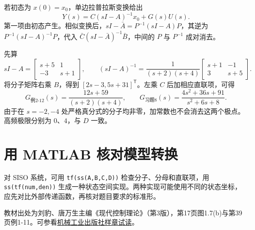 若初态为 $x(0)=x_0$，单边拉普拉斯变换给出
\[
Y(s)=C(sI-A)^{-1}x_0+G(s)U(s).
\]
第一项由初态产生。相似变换后，$sI-\bar A=P^{-1}(sI-A)P$，其逆为 $P^{-1}(sI-A)^{-1}P$，代入 $\bar C(sI-\bar A)^{-1}\bar B$，中间的 $P$ 与 $P^{-1}$ 成对消去。



\sol 先算
\[
sI-A=\begin{bmatrix}s+5&1\\-3&s+1\end{bmatrix},\qquad
(sI-A)^{-1}=\frac{1}{(s+2)(s+4)}
\begin{bmatrix}s+1&-1\\3&s+5\end{bmatrix}.
\]
将分子矩阵右乘 $B$，得到 $[2s-3,5s+31]^{\mathsf T}$。左乘 $C$ 后加相应直联项，可得
\[
G_{\text{例2-12}}(s)=\frac{12s+59}{(s+2)(s+4)},\qquad
G_{\text{习题8}}(s)=\frac{4s^2+36s+91}{s^2+6s+8}.
\]
由于在 $s=-2,-4$ 处严格真分式的分子均非零，加常数也不会消去这两个极点。高频极限分别为 $0$、$4$，与 $D$ 一致。



\section{用 MATLAB 核对模型转换}

对 SISO 系统，可用 \verb|tf(ss(A,B,C,D))| 检查分子、分母和直联项，用 \verb|ss(tf(num,den))| 生成一种状态空间实现。两种实现可能使用不同的状态坐标，应先对比外部传递函数，再核对题目要求的标准形。



\smallskip
\noindent 教材出处为刘豹、唐万生主编《现代控制理论》（第3版），第17页图1.7(b)与第39页例1-11。可参看\href{https://www.cmpedu.com/books/pdf.htm?CHAPTERMODEL=57417}{机械工业出版社样章试读}。

